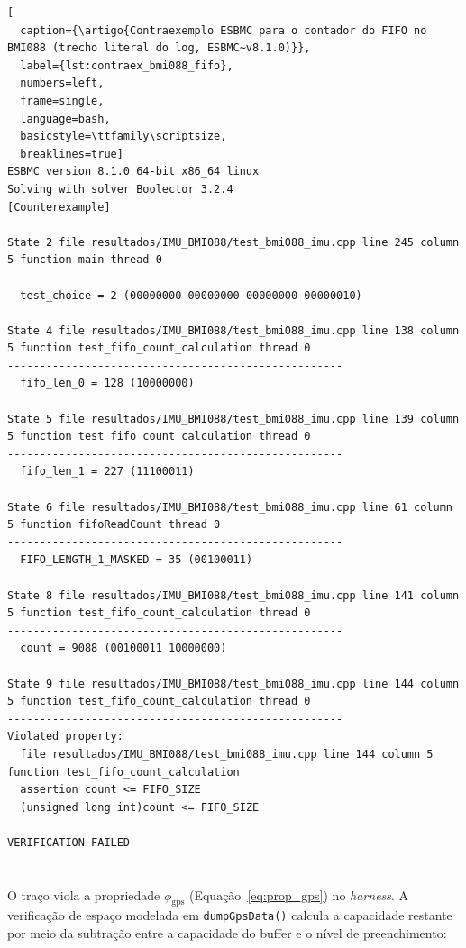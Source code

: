 \begin{lstlisting}[
  caption={\artigo{Contraexemplo ESBMC para o contador do FIFO no BMI088 (trecho literal do log, ESBMC~v8.1.0)}},
  label={lst:contraex_bmi088_fifo},
  numbers=left,
  frame=single,
  language=bash,
  basicstyle=\ttfamily\scriptsize,
  breaklines=true]
ESBMC version 8.1.0 64-bit x86_64 linux
Solving with solver Boolector 3.2.4
[Counterexample]

State 2 file resultados/IMU_BMI088/test_bmi088_imu.cpp line 245 column 5 function main thread 0
----------------------------------------------------
  test_choice = 2 (00000000 00000000 00000000 00000010)

State 4 file resultados/IMU_BMI088/test_bmi088_imu.cpp line 138 column 5 function test_fifo_count_calculation thread 0
----------------------------------------------------
  fifo_len_0 = 128 (10000000)

State 5 file resultados/IMU_BMI088/test_bmi088_imu.cpp line 139 column 5 function test_fifo_count_calculation thread 0
----------------------------------------------------
  fifo_len_1 = 227 (11100011)

State 6 file resultados/IMU_BMI088/test_bmi088_imu.cpp line 61 column 5 function fifoReadCount thread 0
----------------------------------------------------
  FIFO_LENGTH_1_MASKED = 35 (00100011)

State 8 file resultados/IMU_BMI088/test_bmi088_imu.cpp line 141 column 5 function test_fifo_count_calculation thread 0
----------------------------------------------------
  count = 9088 (00100011 10000000)

State 9 file resultados/IMU_BMI088/test_bmi088_imu.cpp line 144 column 5 function test_fifo_count_calculation thread 0
----------------------------------------------------
Violated property:
  file resultados/IMU_BMI088/test_bmi088_imu.cpp line 144 column 5 function test_fifo_count_calculation
  assertion count <= FIFO_SIZE
  (unsigned long int)count <= FIFO_SIZE

VERIFICATION FAILED
\end{lstlisting}

\section[Contraexemplo 3 --- Underflow e acesso fora dos limites (GPS uBlox)]{}
\label{sec:contraexemplo-gps}

O traço viola a propriedade $\phi_{\text{gps}}$
(Equação~\ref{eq:prop_gps}) no \textit{harness}. A verificação de espaço
modelada em \texttt{dumpGpsData()} calcula a capacidade restante por meio da
subtração entre a capacidade do buffer e o nível de preenchimento:

